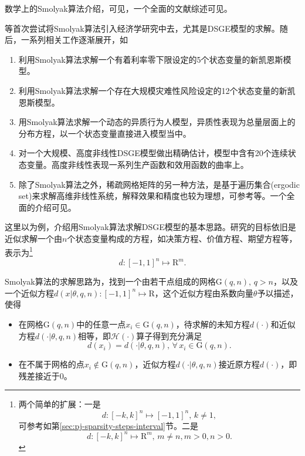 数学上的Smolyak算法介绍，可见\cite{Smolyak:1963tu,Delvos:1982cg, Barthelmann:2000bq}，一个全面的文献综述可见\cite{Bungartz:2004tc}。

\cite{Krueger:2004gh, Malin:2011hf}等首次尝试将Smolyak算法引入经济学研究中去，尤其是DSGE模型的求解。随后，一系列相关工作逐渐展开，如
\begin{enumerate}
  \item \cite{FernandezVillaverde:2015hs}利用Smolyak算法求解一个有着利率零下限设定的5个状态变量的新凯恩斯模型。
  \item \cite{FernandezVillaverde:2016wg}利用Smolyak算法求解一个存在大规模灾难性风险设定的12个状态变量的新凯恩斯模型。
  \item \cite{Gordon:2011ki}用Smolyak算法求解一个动态的异质行为人模型，异质性表现为总量层面上的分布方程，以一个状态变量直接进入模型当中。
  \item \cite{Malin:2011hf}对一个大规模、高度非线性DSGE模型做出精确估计，模型中含有20个连续状态变量。高度非线性表现一系列生产函数和效用函数的曲率上。
  \item  除了Smolyak算法之外，稀疏网格矩阵的另一种方法，是基于遍历集合(ergodic set)来求解高维非线性系统，解释效果和精度也较为理想，可参考\cite{Maliar:2011jd,Judd:2011kb,Judd:2011iw}等。一个全面的介绍可见\cite{Maliar:2015fw}。
\end{enumerate}

这里以\cite{Krueger:2004gh, Malin:2011hf}为例，介绍用Smolyak算法求解DSGE模型的基本思路。研究的目标依旧是近似求解一个由$n$个状态变量构成的方程，如决策方程、价值方程、期望方程等，表示为\footnote{
两个简单的扩展：一是
\begin{equation*}
d: \left[ -k,k \right]^{n} \mapsto \left[ -1,1 \right]^{n}, \, k \neq 1,
\end{equation*}
可参考如第\ref{sec:pj-sparsity-steps-interval}节。二是
\begin{equation*}
  d: \left[ -k,k \right]^{n} \mapsto \mathrm{R}^{m}, \, m \neq n, m >0, n > 0.
\end{equation*}

}
\begin{equation*}
  d: \left[ -1,1 \right]^{n} \mapsto \mathrm{R}^{m}.
\end{equation*}

Smolyak算法的求解思路为，找到一个由若干点组成的网格$\mathrm{G}(q,n), \, q > n$，以及一个近似方程$d \left( x | \theta, q, n\right):\left[ -1, 1 \right]^{n} \mapsto \mathrm{R}$，这个近似方程由系数向量$\theta$予以描述，使得
\begin{itemize}
  \item 在网格$\mathrm{G}(q,n)$中的任意一点$x_{i} \in \mathrm{G}(q,n)$，待求解的未知方程$d(\cdot)$和近似方程$d \left( \cdot | \theta, q , n \right)$相等，即$\mathcal{H} \left( \cdot \right)$算子得到充分满足
  \begin{equation*}
    d \left( x_{i} \right) = d \left( \cdot | \theta, q , n \right), \, \forall \, x_{i} \in \mathrm{G}(q,n).
  \end{equation*}
  \item 在不属于网格的点$x_{i} \notin \mathrm{G}(q,n)$，近似方程$d \left( \cdot | \theta, q , n \right)$接近原方程$d \left( \cdot \right)$，即残差接近于$0$。
\end{itemize}

